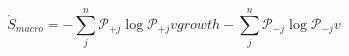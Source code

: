 \begin{equation}
\dot S_{macro} = -\sum_j^n\mathcal P_{+j}\log\mathcal P_{+j}v{growth} -\sum_j^n\mathcal P_{-j}\log\mathcal P_{-j} v
\end{equation}